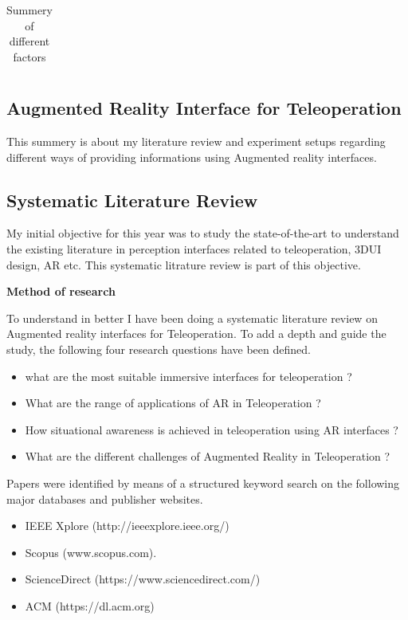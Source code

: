 \begin{longtable}{p{2.5cm} p{5cm} p{5cm} p{1cm}}
\caption{Summery of different factors}
\label{table:tasks}
\end{longtable}

\subsection{Augmented Reality Interface for Teleoperation}
This summery is about my literature review and experiment setups regarding different ways of providing informations using Augmented reality interfaces.

\subsection*{Systematic Literature Review}
My initial objective for this year was to study the state-of-the-art to understand the existing literature in perception interfaces related to teleoperation, 3DUI design, AR etc. This systematic litrature review is part of this objective.

\textbf{Method of research}

To understand in better I have been doing a systematic literature review on Augmented reality interfaces for Teleoperation. To add a depth and guide the study, the following four research questions have been defined.

\begin{itemize}
    \item what are the most suitable immersive interfaces for teleoperation ?
    \item What are the range of applications of AR in Teleoperation ?
    \item How situational awareness is achieved in teleoperation using AR interfaces ?
    \item What are the different challenges of Augmented Reality in Teleoperation ?
\end{itemize}

Papers were identified by means of a structured keyword search on the following major databases and publisher websites.

\begin{itemize}
    \item IEEE Xplore (http://ieeexplore.ieee.org/)
    \item Scopus (www.scopus.com).
    \item ScienceDirect (https://www.sciencedirect.com/)
    \item ACM (https://dl.acm.org)
\end{itemize}\\

